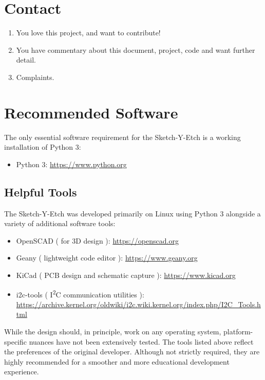 \documentclass[]{article}
\begin{document}
\section*{Contact}
\begin{enumerate}
\item You love this project, and want to contribute!
\item You have commentary about this document, project, code and want further detail.
\item Complaints.
\end{enumerate}
\section*{Recommended Software}

The only essential software requirement for the Sketch-Y-Etch is a working installation of Python 3:

\begin{itemize}
	\item Python 3: \url{https://www.python.org}
\end{itemize}

\subsection*{Helpful Tools}

The Sketch-Y-Etch was developed primarily on Linux using Python 3 alongside a variety of additional software tools:

\begin{itemize}
	\item OpenSCAD ( for 3D design ): \url{https://openscad.org}
	\item Geany ( lightweight code editor ): \url{https://www.geany.org}
	\item KiCad ( PCB design and schematic capture ): \url{https://www.kicad.org}
	\item i2c-tools ( I\textsuperscript{2}C communication utilities ): \url{https://archive.kernel.org/oldwiki/i2c.wiki.kernel.org/index.php/I2C_Tools.html}
\end{itemize}

While the design should, in principle, work on any operating system, platform-specific nuances have not been extensively tested.  
The tools listed above reflect the preferences of the original developer. Although not strictly required, they are highly recommended for a smoother and more educational development experience.
\end{document}
